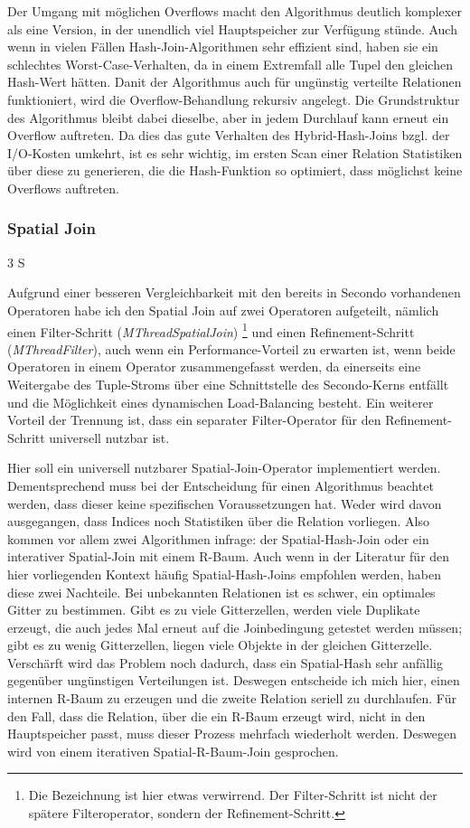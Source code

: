 \documentclass[a4paper,12pt,twoside]{article}
\newcommand{\Fb}[1]{\textit{#1}} %
\begin{document}
Der Umgang mit möglichen Overflows macht den Algorithmus deutlich komplexer als eine Version, in der unendlich viel Hauptspeicher zur Verfügung stünde. Auch wenn in vielen Fällen Hash-Join-Algorithmen sehr effizient sind, haben sie ein schlechtes Worst-Case-Verhalten, da in einem Extremfall alle Tupel den gleichen Hash-Wert hätten. Danit der Algorithmus auch für ungünstig verteilte Relationen funktioniert, wird die Overflow-Behandlung rekursiv angelegt. Die Grundstruktur des Algorithmus bleibt dabei dieselbe, aber in jedem Durchlauf kann erneut ein Overflow auftreten. Da dies das gute Verhalten des Hybrid-Hash-Joins bzgl. der I/O-Kosten umkehrt, ist es sehr wichtig, im ersten Scan einer Relation Statistiken über diese zu generieren, die die Hash-Funktion so optimiert, dass möglichst keine Overflows auftreten.

\subsubsection{Spatial Join} 3 S

Aufgrund einer besseren Vergleichbarkeit mit den bereits in Secondo vorhandenen Operatoren habe ich den Spatial Join auf zwei Operatoren aufgeteilt, nämlich einen Filter-Schritt (\Fb{MThreadSpatialJoin}) \footnote{Die Bezeichnung ist hier etwas verwirrend. Der Filter-Schritt ist nicht der spätere Filteroperator, sondern der Refinement-Schritt.} und einen Refinement-Schritt (\Fb{MThreadFilter}), auch wenn ein Performance-Vorteil zu erwarten ist, wenn beide Operatoren in einem Operator zusammengefasst werden, da einerseits eine Weitergabe des Tuple-Stroms über eine Schnittstelle des Secondo-Kerns entfällt und die Möglichkeit eines dynamischen Load-Balancing besteht. Ein weiterer Vorteil der Trennung ist, dass ein separater Filter-Operator für den Refinement-Schritt universell nutzbar ist.

Hier soll ein universell nutzbarer Spatial-Join-Operator implementiert werden. Dementsprechend muss bei der Entscheidung für einen Algorithmus beachtet werden, dass dieser keine spezifischen Voraussetzungen hat. Weder wird davon ausgegangen, dass Indices noch Statistiken über die Relation vorliegen. Also kommen vor allem zwei Algorithmen infrage: der Spatial-Hash-Join oder ein interativer Spatial-Join mit einem R-Baum. Auch wenn in der Literatur für den hier vorliegenden Kontext häufig Spatial-Hash-Joins empfohlen werden, haben diese zwei Nachteile. Bei unbekannten Relationen ist es schwer, ein optimales Gitter zu bestimmen. Gibt es zu viele Gitterzellen, werden viele Duplikate erzeugt, die auch jedes Mal erneut auf die Joinbedingung getestet werden müssen;  gibt es zu wenig Gitterzellen, liegen viele Objekte in der gleichen Gitterzelle. Verschärft wird das Problem noch dadurch, dass ein Spatial-Hash sehr anfällig gegenüber ungünstigen Verteilungen ist. Deswegen entscheide ich mich hier, einen internen R-Baum zu erzeugen und die zweite Relation seriell zu durchlaufen. Für den Fall, dass die Relation, über die ein R-Baum erzeugt wird, nicht in den Hauptspeicher passt, muss dieser Prozess mehrfach wiederholt werden. Deswegen wird von einem iterativen Spatial-R-Baum-Join gesprochen.
\end{document}
